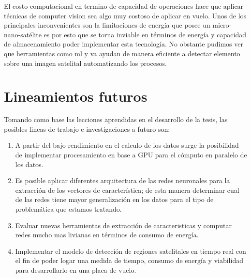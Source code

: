 El costo computacional en termino de capacidad de operaciones hace que aplicar técnicas de computer vision sea algo muy costoso de aplicar en vuelo. Unos de los principales inconvenientes son la limitaciones de energía que posee un micro-nano-satélite es por esto que se torna inviable en términos de energía y capacidad de almacenamiento poder implementar esta tecnología. No obstante pudimos ver que herramientas como \ac{ml} y \ac{va} ayudan de manera eficiente a detectar elemento sobre una imagen satelital automatizando los procesos.


\section{Lineamientos futuros}\label{linasfuturas}
Tomando como base las lecciones aprendidas en el desarrollo de la tesis, las posibles lineas de trabajo e investigaciones a futuro son:
\begin{enumerate}
 \item A partir del bajo rendimiento en el calculo de los datos surge la posibilidad de implementar procesamiento en base a GPU para el cómputo en paralelo de los datos.
 \item Es posible aplicar diferentes arquitectura de las redes neuronales para la extracción de los vectores de característica; de esta manera determinar cual de las redes tiene mayor generalización en los datos para el tipo de problemática que estamos tratando.
 \item Evaluar nuevas herramientas de extracción de caracteristicas y computar redes mucho mas livianas en términos de consumo de energía.
\item Implementar el modelo de detección de regiones satelitales en tiempo real con el fin de poder logar una medida de tiempo, consumo de energía y viabilidad para desarrollarlo en una placa de vuelo. 
\end{enumerate}